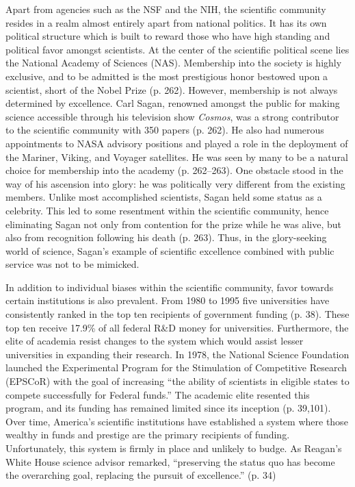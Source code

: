 \documentclass{article}[12pt]
\begin{document}
Apart from agencies such as the NSF and the NIH, the scientific community
resides in a realm almost entirely apart from national politics. It has its own
political structure which is built to reward those who have high standing and
political favor amongst scientists. At the center of the scientific political
scene lies the National Academy of Sciences (NAS).  Membership into the society
is highly exclusive, and to be admitted is the most prestigious honor bestowed
upon a scientist, short of the Nobel Prize (p. 262). However, membership is not
always determined by excellence. Carl Sagan, renowned amongst the public for
making science accessible through his television show \emph{Cosmos}, was a
strong contributor to the scientific community with 350 papers (p. 262).  He
also had numerous appointments to NASA advisory positions and played a role in
the deployment of the Mariner, Viking, and Voyager satellites. He was seen by
many to be a natural choice for membership into the academy (p. 262--263). One
obstacle stood in the way of his ascension into glory: he was politically very
different from the existing members. Unlike most accomplished scientists, Sagan
held some status as a celebrity. This led to some resentment within the
scientific community, hence eliminating Sagan not only from contention for the
prize while he was alive, but also from recognition following his death (p.
263). Thus, in the glory-seeking world of science, Sagan's example of
scientific excellence combined with public service was not to be mimicked.

In addition to individual biases within the scientific community, favor towards
certain institutions is also prevalent.  From 1980 to 1995 five universities
have consistently ranked in the top ten recipients of government funding (p.
38).  These top ten receive 17.9\% of all federal R\&D money for universities.
Furthermore, the elite of academia resist changes to the system which would
assist lesser universities in expanding their research. In 1978, the National
Science Foundation launched the Experimental Program for the Stimulation of
Competitive Research (EPSCoR) with the goal of increasing ``the ability of
scientists in eligible states to compete successfully for Federal funds.'' The
academic elite resented this program, and its funding has remained limited
since its inception (p. 39,101).  Over time, America's scientific institutions
have established a system where those wealthy in funds and prestige are the
primary recipients of funding.  Unfortunately, this system is firmly in place
and unlikely to budge. As Reagan's White House science advisor remarked,
``preserving the status quo has become the overarching goal, replacing the
pursuit of excellence.'' (p. 34)
\end{document}
